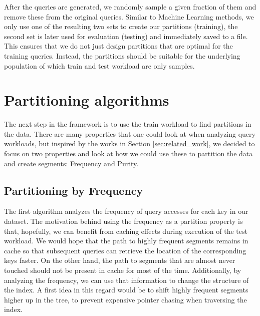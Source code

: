 After the queries are generated, we randomly sample a given fraction of them and remove these from the original queries. Similar to Machine Learning methods, we only use one of the resulting two sets to create our partitions (training), the second set is later used for evaluation (testing) and immediately saved to a file. This ensures that we do not just design partitions that are optimal for the training queries. Instead, the partitions should be suitable for the underlying population of which train and test workload are only samples.

\section{Partitioning algorithms}
The next step in the framework is to use the train workload to find partitions in the data. There are many properties that one could look at when analyzing query workloads, but inspired by the works in Section \ref{sec:related_work}, we decided to focus on two properties and look at how we could use these to partition the data and create segments: Frequency and Purity.

\subsection{Partitioning by Frequency} \label{sec:frequency}
The first algorithm analyzes the frequency of query accesses for each key in our dataset. The motivation behind using the frequency as a partition property is that, hopefully, we can benefit from caching effects during execution of the test workload. We would hope that the path to highly frequent segments remains in cache so that subsequent queries can retrieve the location of the corresponding keys faster. On the other hand, the path to segments that are almost never touched should not be present in cache for most of the time. Additionally, by analyzing the frequency, we can use that information to change the structure of the index. A first idea in this regard would be to shift highly frequent segments higher up in the tree, to prevent expensive pointer chasing when traversing the index.

